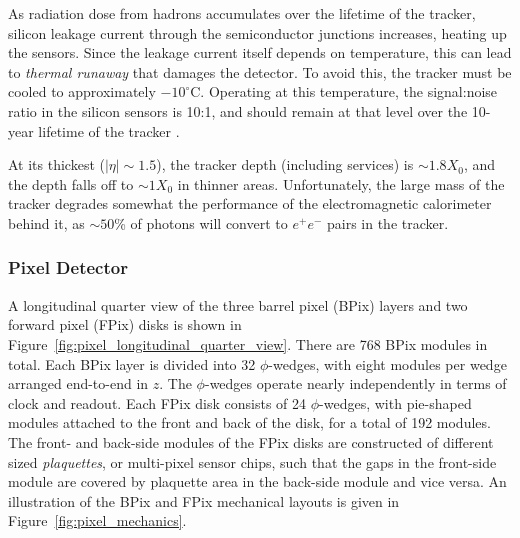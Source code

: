 \documentclass[dissertation.tex]{subfiles}
\begin{document}
As radiation dose from hadrons accumulates over the lifetime of the tracker, silicon leakage current through the semiconductor junctions increases, heating up the sensors.  Since the leakage current itself depends on temperature, this can lead to \textit{thermal runaway} that damages the detector.  To avoid this, the tracker must be cooled to approximately $-10^{\circ}$C.  Operating at this temperature, the signal:noise ratio in the silicon sensors is 10:1, and should remain at that level over the 10-year lifetime of the tracker \cite{CMS_detector_paper}.

At its thickest ($|\eta|\sim1.5$), the tracker depth (including services) is $\sim1.8X_{0}$, and the depth falls off to $\sim1X_{0}$ in thinner areas.  Unfortunately, the large mass of the tracker degrades somewhat the performance of the electromagnetic calorimeter behind it, as $\sim50$\% of photons will convert to $e^{+}e^{-}$ pairs in the tracker.

\subsubsection{Pixel Detector}
\label{sec:Pixel Detector}

A longitudinal quarter view of the three barrel pixel (BPix) layers and two forward pixel (FPix) disks is shown in Figure~\ref{fig:pixel_longitudinal_quarter_view}.  There are 768 BPix modules in total.  Each BPix layer is divided into 32 $\phi$-wedges, with eight modules per wedge arranged end-to-end in $z$.  The $\phi$-wedges operate nearly independently in terms of clock and readout.  Each FPix disk consists of 24 $\phi$-wedges, with pie-shaped modules attached to the front and back of the disk, for a total of 192 modules.  The front- and back-side modules of the FPix disks are constructed of different sized \textit{plaquettes}, or multi-pixel sensor chips, such that the gaps in the front-side module are covered by plaquette area in the back-side module and vice versa.  An illustration of the BPix and FPix mechanical layouts is given in Figure~\ref{fig:pixel_mechanics}.
\end{document}
